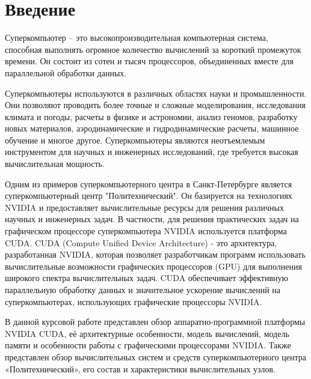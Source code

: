 \documentclass[a4paper, 12pt]{article}
\begin{document}
	
	\newpage
	\tableofcontents
	

    \newpage
	\section*{Введение}
    Суперкомпьютер -- это высокопроизводительная компьютерная система, способная выполнять огромное количество вычислений за короткий промежуток времени. Он состоит из сотен и тысяч процессоров, объединенных вместе для параллельной обработки данных.
    
    Суперкомпьютеры используются в различных областях науки и промышленности. Они позволяют проводить более точные и сложные моделирования, исследования климата и погоды, расчеты в физике и астрономии, анализ геномов, разработку новых материалов, аэродинамические и гидродинамические расчеты, машинное обучение и многое другое. Суперкомпьютеры являются неотъемлемым инструментом для научных и инженерных исследований, где требуется высокая вычислительная мощность.
    
    Одним из примеров суперкомпьютерного центра в Санкт-Петербурге является суперкомпьютерный центр "Политехнический". Он базируется на технологиях NVIDIA и предоставляет вычислительные ресурсы для решения различных научных и инженерных задач. В частности, для решения практических задач на графическом процессоре суперкомпьютера NVIDIA используется платформа CUDA. CUDA (Compute Unified Device Architecture) - это архитектура, разработанная NVIDIA, которая позволяет разработчикам программ использовать вычислительные возможности графических процессоров (GPU) для выполнения широкого спектра вычислительных задач. CUDA обеспечивает эффективную параллельную обработку данных и значительное ускорение вычислений на суперкомпьютерах, использующих графические процессоры NVIDIA.
    
    В данной курсовой работе представлен обзор аппаратно-программной платформы \linebreak NVIDIA CUDA, её архитектурные особенности, модель вычислений, модель памяти и особенности работы с графическими процессорами NVIDIA. Также представлен обзор вычислительных систем и средств суперкомпьютерного центра «Политехнический», его состав и характеристики вычислительных узлов.
    
\end{document}
